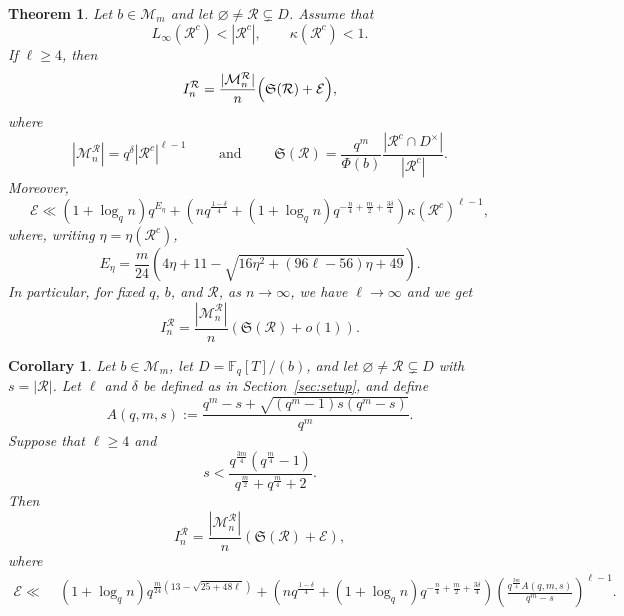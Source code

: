 \documentclass[10pt,a4paper]{amsart}
\newtheorem{thm}{Theorem}
\newtheorem{cor}{Corollary}
\newcommand{\F}{\mathbb F}
\begin{document}
\begin{thm}\label{thm:main} Let $b\in\mathcal M_m$ and let $\varnothing\neq\mathcal R\subsetneq D$. Assume that \[ L_\infty(\mathcal R^c)<|\mathcal R^c|, \qquad \kappa(\mathcal R^c)<1. \]
If $\ell\geq4$, then \begin{equation*}%
I_n^{\mathcal R} =\frac{|\mathcal M_n^{\mathcal R}|}{n}\Bigl(\mathfrak S(\mathcal R)+\mathcal E\Bigr), \end{equation*} where \[ |\mathcal M_n^{\mathcal R}|=q^\delta|\mathcal R^c|^{\ell-1} \qquad \mbox{ and }\qquad \mathfrak S(\mathcal R)=\frac{q^m}{\Phi(b)} \frac{|\mathcal R^c\cap D^\times|}{|\mathcal R^c|}.\] 
Moreover, \[ \mathcal E\ll(1+\log_q n)q^{E_\eta} +\left(nq^{\frac{1-\delta}{4}} +(1+\log_q n)q^{-\frac n4+\frac m2+\frac{3\delta}{4}}\right) \kappa(\mathcal R^c)^{\ell-1}, \] where, writing $\eta=\eta(\mathcal R^c)$, \[ E_\eta=\frac{m}{24}\left(4\eta+11-\sqrt{16\eta^2+(96\ell-56)\eta+49}\right). \] 
In particular, for fixed $q$, $b$, and $\mathcal R$, as $n\to\infty$, we have $\ell\rightarrow \infty$ and we get 
\[
I_n^{\mathcal R}
=
\frac{|\mathcal M_n^{\mathcal R}|}{n}
\left(\mathfrak S(\mathcal R)+o(1)\right).
\]
\end{thm}

\begin{cor}\label{cor:cardinality}
Let $b\in\mathcal M_m$, let $D=\F_q[T]/(b)$, and let
$\varnothing\neq\mathcal R\subsetneq D$ with $s=|\mathcal R|$.
Let $\ell$ and $\delta$ be defined as in Section~\ref{sec:setup},
and define
\[
A(q,m,s):=
\frac{q^m-s+\sqrt{(q^m-1)s(q^m-s)}}{q^m}.
\]
Suppose that $\ell\geq4$ and
\begin{equation}\label{eq:s-cond}
s<
\frac{q^{\frac{3m}{4}}
\left(q^{\frac m4}-1\right)}
{q^{\frac m2}+q^{\frac m4}+2}.
\end{equation}
Then
\[
I_n^{\mathcal R}
=
\frac{|\mathcal M_n^{\mathcal R}|}{n}
\left(\mathfrak S(\mathcal R)+\mathcal E\right),
\] where
\begin{align*}
\mathcal E\ll\;&
(1+\log_q n)
q^{\frac m{24}\left(13-\sqrt{25+48\ell}\right)}
+
\left(
nq^{\frac{1-\delta}{4}}
+
(1+\log_q n)
q^{-\frac n4+\frac m2+\frac{3\delta}{4}}
\right)
\left(
\frac{q^{\frac{3m}{4}}A(q,m,s)}{q^m-s}
\right)^{\ell-1}.
\end{align*}
\end{cor}
\end{document}
